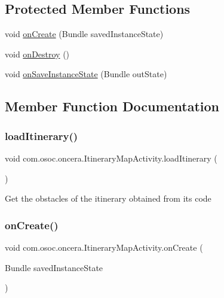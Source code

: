 \subsection*{Protected Member Functions}
\begin{DoxyCompactItemize}
\item 
void \mbox{\hyperlink{classcom_1_1osoc_1_1oncera_1_1_itinerary_map_activity_ab084d25f0437fa7c48f5de91bbe93a17}{on\+Create}} (Bundle saved\+Instance\+State)
\item 
void \mbox{\hyperlink{classcom_1_1osoc_1_1oncera_1_1_itinerary_map_activity_ae94f7c1e0a72cd559b5dbce90dfca158}{on\+Destroy}} ()
\item 
void \mbox{\hyperlink{classcom_1_1osoc_1_1oncera_1_1_itinerary_map_activity_a63fc9542a704e8556933cd4261737d89}{on\+Save\+Instance\+State}} (Bundle out\+State)
\end{DoxyCompactItemize}


\subsection{Member Function Documentation}
\mbox{\label{classcom_1_1osoc_1_1oncera_1_1_itinerary_map_activity_a78e3228f400a80bc723880d90dcf58a4}} 
\subsubsection{\texorpdfstring{loadItinerary()}{loadItinerary()}}
{\footnotesize\ttfamily void com.\+osoc.\+oncera.\+Itinerary\+Map\+Activity.\+load\+Itinerary (\begin{DoxyParamCaption}{ }\end{DoxyParamCaption})}

Get the obstacles of the itinerary obtained from its code \mbox{\label{classcom_1_1osoc_1_1oncera_1_1_itinerary_map_activity_ab084d25f0437fa7c48f5de91bbe93a17}} 
\subsubsection{\texorpdfstring{onCreate()}{onCreate()}}
{\footnotesize\ttfamily void com.\+osoc.\+oncera.\+Itinerary\+Map\+Activity.\+on\+Create (\begin{DoxyParamCaption}\item[{Bundle}]{saved\+Instance\+State }\end{DoxyParamCaption})\hspace{0.3cm}{\ttfamily [protected]}}

